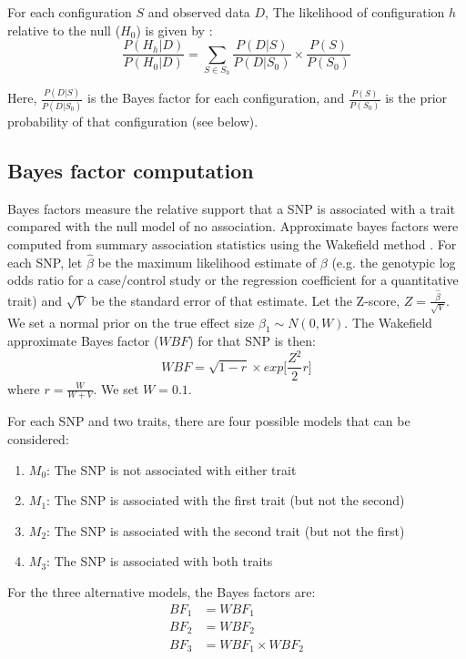 \documentclass{article}
\begin{document}
For each configuration $S$ and observed data $D$, The likelihood of configuration $h$ relative to the null ($H_0$) is given by \citep{Giambartolomei:2014aa}:
\begin{equation}
\label{rbf_equation}
\frac{P(H_h|D)}{P(H_0|D)} = \sum_{S \in S_h} \frac{P(D|S)}{P(D|S_0)} \times \frac{P(S)}{P(S_0)}
\end{equation}

\noindent Here, $\frac{P(D|S)}{P(D|S_0)}$ is the Bayes factor for each configuration, and $\frac{P(S)}{P(S_0)}$ is the prior probability of that configuration (see below).

\subsection{Bayes factor computation}
\label{bf_comp}
Bayes factors measure the relative support that a SNP is associated with a trait compared with the null model of no association. Approximate bayes factors were computed from summary association statistics using the Wakefield method \citep{Wakefield:2009aa}. For each SNP, let $\hat{\beta}$ be the maximum likelihood estimate of $\beta$ (e.g. the genotypic log odds ratio for a case/control study or the regression coefficient for a quantitative trait) and $\sqrt{V}$ be the standard error of that estimate. Let the Z-score, $Z = \frac{\hat{\beta}}{\sqrt{V}}$. We set a normal prior on the true effect size $\beta_1 \sim N(0,W)$. The Wakefield approximate Bayes factor ($WBF$) for that SNP is then:
\begin{equation}
WBF = \sqrt{1-r} \times exp \Big[\frac{Z^2}{2} r \Big]
\end{equation}
where $r = \frac{W}{W+V}$. We set $W = 0.1$.

For each SNP and two traits, there are four possible models that can be considered:
\begin{enumerate}[start=0]
  \item $M_0$: The SNP is not associated with either trait
  \item $M_1$: The SNP is associated with the first trait (but not the second)
  \item $M_2$: The SNP is associated with the second trait (but not the first)
  \item $M_3$: The SNP is associated with both traits
\end{enumerate}

\noindent For the three alternative models, the Bayes factors are:
\begin{align}
BF_1 & = WBF_1 \\
BF_2 & = WBF_2 \\
BF_3 & = WBF_1 \times WBF_2
\end{align}
\end{document}

